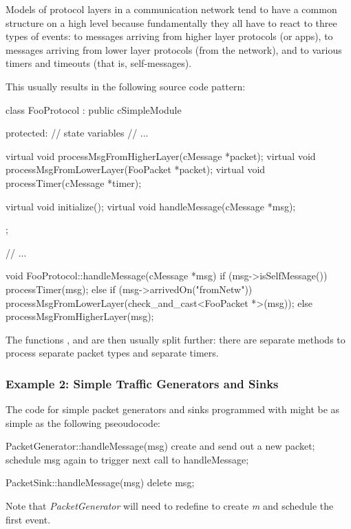 Models of protocol layers in a communication network tend to have
a common structure on a high level because fundamentally they all have to react
to three types of events: to messages arriving from higher layer protocols
(or apps), to messages arriving from lower layer protocols (from the network),
and to various timers and timeouts (that is, self-messages).

This usually results in the following source code pattern:

\begin{cpp}
class FooProtocol : public cSimpleModule
{
  protected:
    // state variables
    // ...

    virtual void processMsgFromHigherLayer(cMessage *packet);
    virtual void processMsgFromLowerLayer(FooPacket *packet);
    virtual void processTimer(cMessage *timer);

    virtual void initialize();
    virtual void handleMessage(cMessage *msg);
};

// ...

void FooProtocol::handleMessage(cMessage *msg)
{
    if (msg->isSelfMessage())
        processTimer(msg);
    else if (msg->arrivedOn("fromNetw"))
        processMsgFromLowerLayer(check_and_cast<FooPacket *>(msg));
    else
        processMsgFromHigherLayer(msg);
}
\end{cpp}

The functions , 
and  are then usually split further: there are separate
methods to process separate packet types and separate timers.


\subsubsection{Example 2: Simple Traffic Generators and Sinks}


The code for simple packet generators and sinks programmed with  might
be as simple as the following pseoudocode:

\begin{cpp}
PacketGenerator::handleMessage(msg)
{
    create and send out a new packet;
    schedule msg again to trigger next call to handleMessage;
}

PacketSink::handleMessage(msg)
{
    delete msg;
}
\end{cpp}

Note that \textit{PacketGenerator} will need to redefine 
to create \textit{m} and schedule the first event.

